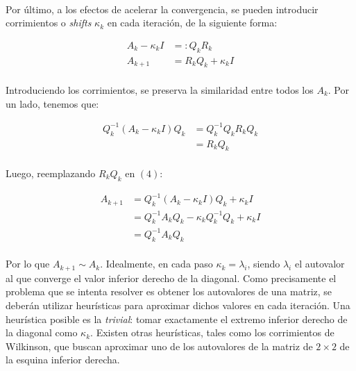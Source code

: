 \documentclass[12pt, twocolumn]{article}
\begin{document}
	\paragraph{} Por último, a los efectos de acelerar la convergencia, se pueden introducir corrimientos o \textit{shifts} $\kappa_{k}$ en cada iteración, de la siguiente forma:
	
	\begin{align}
		A_{k} - \kappa_{k}I &=: Q_{k}R_{k} \\
		A_{k+1} &= R_{k}Q_{k} + \kappa_{k}I 
	\end{align}
	
	\paragraph{} Introduciendo los corrimientos, se preserva la similaridad entre todos los $A_{k}$. Por un lado, tenemos que:
	
	\begin{align}
		Q_{k}^{-1}(A_{k} - \kappa_{k}I)Q_{k} &= Q_{k}^{-1}Q_{k}R_{k}Q_{k}  \\ &= R_{k}Q_{k}
	\end{align}
	
	\paragraph{} Luego, reemplazando $R_{k}Q_{k}$ en $(4)$:
	
	\begin{align}
		A_{k+1} &= Q_{k}^{-1}(A_{k} - \kappa_{k}I)Q_{k} + \kappa_{k}I \\ &= Q_{k}^{-1}A_{k}Q_{k} - \kappa_{k}Q_{k}^{-1}Q_{k} + \kappa_{k}I  \\ &= Q_{k}^{-1}A_{k}Q_{k}  
	\end{align}
	
	\paragraph{} Por lo que $A_{k+1} \sim A_{k}$. Idealmente, en cada paso $\kappa_{k} = \lambda_{i}$, siendo $\lambda_{i}$ el autovalor al que converge el valor inferior derecho de la diagonal. Como precisamente el problema que se intenta resolver es obtener los autovalores de una matriz, se deberán utilizar heurísticas para aproximar dichos valores en cada iteración. Una heurística posible es la \textit{trivial}: tomar exactamente el extremo inferior derecho de la diagonal como $\kappa_{k}$. Existen otras heurísticas, tales como los corrimientos de Wilkinson, que buscan aproximar uno de los autovalores de la matriz de $2\times2$ de la esquina inferior derecha.
	
\end{document}
